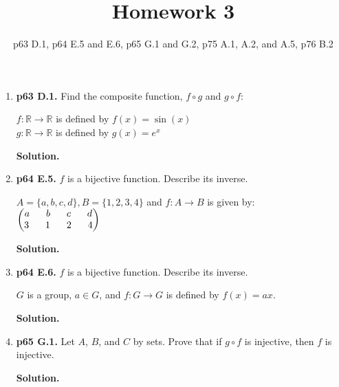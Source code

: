 \documentclass[11pt]{article}
\begin{document}
\title{Homework 3}
\date{p63 D.1, p64 E.5 and E.6, p65 G.1 and G.2, p75 A.1, A.2, and A.5, p76 B.2}
\maketitle

\thispagestyle{fancy}  
\pagestyle{fancy}      

\begin{enumerate}

\item {\bfseries p63 D.1.} Find the composite function, $f \circ g$ and $g \circ f$:

	$f : \mathbb{R} \rightarrow \mathbb{R}$ is defined by $f(x) = \sin(x)$ \\
	$g : \mathbb{R} \rightarrow \mathbb{R}$ is defined by $g(x) = e^x$
  
	{\bfseries Solution.}

\item {\bfseries p64 E.5.} $f$ is a bijective function. Describe its inverse.

	$A = \{a,b,c,d\}, B = \{1,2,3,4\}$ and $f : A \rightarrow B$ is given by: \\
	$\begin{pmatrix}
		a \hspace{6mm} b \hspace{6mm} c \hspace{6mm} d \\
		3 \hspace{6mm} 1 \hspace{6mm} 2 \hspace{6mm} 4 \\
	\end{pmatrix}$
  
	{\bfseries Solution.}

\item {\bfseries p64 E.6.} $f$ is a bijective function. Describe its inverse.

	$G$ is a group, $a \in G$, and $f : G \rightarrow G$ is defined by $f(x) = ax$.
  
	{\bfseries Solution.}
  
\newpage

\item {\bfseries p65 G.1.} Let $A$, $B$, and $C$ by sets. Prove that if $g \circ f$ is injective, then $f$ is injective.
  
	{\bfseries Solution.}


\end{enumerate}
\end{document}
